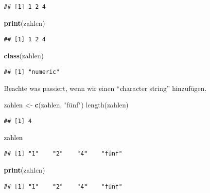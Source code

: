 \documentclass[
]{book}
\newenvironment{Shaded}{\begin{snugshade}}{\end{snugshade}}
\newcommand{\KeywordTok}[1]{\textcolor[rgb]{0.13,0.29,0.53}{\textbf{#1}}}
\newcommand{\NormalTok}[1]{#1}
\newcommand{\StringTok}[1]{\textcolor[rgb]{0.31,0.60,0.02}{#1}}
\begin{document}
\begin{verbatim}
## [1] 1 2 4
\end{verbatim}

\begin{Shaded}
\begin{Highlighting}[]
\KeywordTok{print}\NormalTok{(zahlen)}
\end{Highlighting}
\end{Shaded}

\begin{verbatim}
## [1] 1 2 4
\end{verbatim}

\begin{Shaded}
\begin{Highlighting}[]
\KeywordTok{class}\NormalTok{(zahlen)}
\end{Highlighting}
\end{Shaded}

\begin{verbatim}
## [1] "numeric"
\end{verbatim}

Beachte was passiert, wenn wir einen ``character string'' hinzufügen.

\begin{Shaded}
\begin{Highlighting}[]
\NormalTok{zahlen <-}\StringTok{ }\KeywordTok{c}\NormalTok{(zahlen, }\StringTok{"fünf")}
\StringTok{length(zahlen)}
\end{Highlighting}
\end{Shaded}

\begin{verbatim}
## [1] 4
\end{verbatim}

\begin{Shaded}
\begin{Highlighting}[]
\NormalTok{zahlen}
\end{Highlighting}
\end{Shaded}

\begin{verbatim}
## [1] "1"    "2"    "4"    "fünf"
\end{verbatim}

\begin{Shaded}
\begin{Highlighting}[]
\KeywordTok{print}\NormalTok{(zahlen)}
\end{Highlighting}
\end{Shaded}

\begin{verbatim}
## [1] "1"    "2"    "4"    "fünf"
\end{verbatim}
\end{document}
